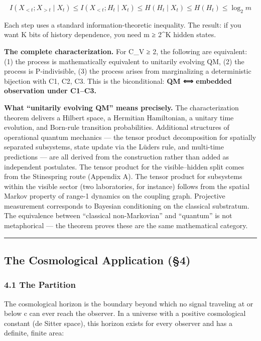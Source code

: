 \documentclass[
]{article}
\begin{document}
\[I(X_{<t} ; X_{>t} \mid X_t) \leq I(X_{<t} ; H_t \mid X_t) \leq H(H_t \mid X_t) \leq H(H_t) \leq \log_2 m\]

Each step uses a standard information-theoretic inequality. The result:
if you want K bits of history dependence, you need m ≥ 2\^{}K hidden
states.

\textbf{The complete characterization.} For \textbar C\_V\textbar{} ≥ 2,
the following are equivalent: (1) the process is mathematically
equivalent to unitarily evolving QM, (2) the process is P-indivisible,
(3) the process arises from marginalizing a deterministic bijection with
C1, C2, C3. This is the biconditional: \textbf{QM ⟺ embedded observation
under C1--C3.}

\textbf{What ``unitarily evolving QM'' means precisely.} The
characterization theorem delivers a Hilbert space, a Hermitian
Hamiltonian, a unitary time evolution, and Born-rule transition
probabilities. Additional structures of operational quantum mechanics
--- the tensor product decomposition for spatially separated subsystems,
state update via the Lüders rule, and multi-time predictions --- are all
derived from the construction rather than added as independent
postulates. The tensor product for the visible--hidden split comes from
the Stinespring route (Appendix A). The tensor product for subsystems
within the visible sector (two laboratories, for instance) follows from
the spatial Markov property of range-1 dynamics on the coupling graph.
Projective measurement corresponds to Bayesian conditioning on the
classical substratum. The equivalence between ``classical
non-Markovian'' and ``quantum'' is not metaphorical --- the theorem
proves these are the same mathematical category.

\begin{center}\rule{0.5\linewidth}{0.5pt}\end{center}

\hypertarget{the-cosmological-application-4}{%
\subsection{The Cosmological Application
(§4)}\label{the-cosmological-application-4}}

\hypertarget{the-partition}{%
\subsubsection{4.1 The Partition}\label{the-partition}}

The cosmological horizon is the boundary beyond which no signal
traveling at or below c can ever reach the observer. In a universe with
a positive cosmological constant (de Sitter space), this horizon exists
for every observer and has a definite, finite area:
\end{document}
